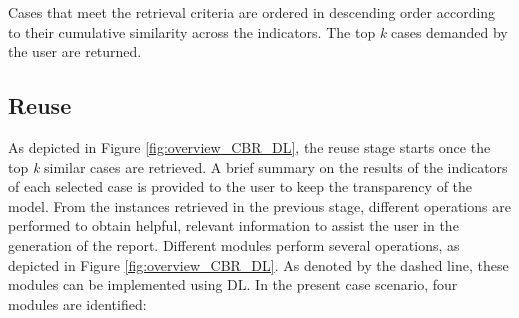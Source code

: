 Cases that meet the retrieval criteria are ordered in descending order according to their cumulative similarity across the indicators. The top \textit{k} cases demanded by the user are returned.

\subsection{Reuse}\label{5_sec:dl_powered_cbr_reuse}
As depicted in Figure \ref{fig:overview_CBR_DL}, the reuse stage starts once the top \textit{k} similar cases are retrieved. A brief summary on the results of the indicators of each selected case is provided to the user to keep the transparency of the model. From the instances retrieved in the previous stage, different operations are performed to obtain helpful, relevant information to assist the user in the generation of the report. Different modules perform several operations, as depicted in Figure \ref{fig:overview_CBR_DL}. As denoted by the dashed line, these modules can be implemented using DL. In the present case scenario, four modules are identified:
